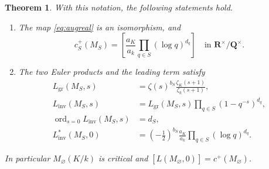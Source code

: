 \documentclass[11pt]{amsart}
\numberwithin{equation}{section}
\newtheorem{theorem}{Theorem}[section]
\theoremstyle{definition}
\theoremstyle{remark}
\newcommand{\Q}{\mathbf Q}
\newcommand{\R}{\mathbf R}
\newcommand{\ord}{\operatorname{ord}}
\newcommand{\gr}{\operatorname{gr}}
\begin{document}
\begin{theorem}\label{thm:relative}
With this notation, the following statements hold.
\begin{enumerate}
\item The map \eqref{eq:augreal} is an isomorphism, and
\begin{equation}\label{eq:archformula}
 c_S^+(M_S)=
 \left[\frac{a_K}{a_k}\prod_{q\in S}(\log q)^{d_q}\right]
 \quad\text{in }\R^\times/\Q^\times .
\end{equation}
\item The two Euler products and the leading term satisfy
\begin{align}
 L_{\gr}(M_S,s)&=\zeta(s)^{b_S}
                 \frac{\zeta_K(s+1)}{\zeta_k(s+1)},\label{eq:grrelative}\\
 L_{\mathrm{inv}}(M_S,s)&=L_{\gr}(M_S,s)
                      \prod_{q\in S}(1-q^{-s})^{d_q},\label{eq:invrelative}\\
 \ord_{s=0}L_{\mathrm{inv}}(M_S,s)&=d_S,\nonumber\\
 L_{\mathrm{inv}}^*(M_S,0)&=
 \left(-\frac12\right)^{b_S}\frac{a_K}{a_k}
                 \prod_{q\in S}(\log q)^{d_q}.\label{eq:invrelativelead}
\end{align}
\end{enumerate}
In particular $M_\varnothing(K/k)$ is critical and
$[L(M_\varnothing,0)]=c^+(M_\varnothing)$.
\end{theorem}
\end{document}
